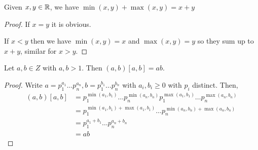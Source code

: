 \begin{lemma}
    Given $x, y \in \mathbb{R}$, we have $\min(x, y) + \max(x, y) = x + y$
\end{lemma}
\begin{proof}
    If $x = y$  it is obvious.

    If  $x < y$ then we have  $\min(x,y) = x$ and $\max(x, y) = y$ so they sum up to $x + y$, similar for $x > y$.
\end{proof}

\begin{theorem}
    Let $a, b \in Z$  with $a, b > 1$. Then $(a,b)[a,b] = ab$. 
\end{theorem}
\begin{proof}
    Write $a = p_1^{a_1} \dots p_n^{a_n}, b = p_1^{b_1} \dots p_n^{b_n}$  with $a_i,b_i \ge 0$ with  $p_i$ distinct. Then, 
     \begin{align*}
         (a, b)[a,b] &= p_1^{\min(a_1,b_1)} \dots p_n^{\min(a_n, b_n)} p_1^{\max(a_1,b_1)} \dots p_n^{\max(a_n, b_n)} \\
                    &= p_1^{\min(a_1,b_1) + \max(a_1, b_1)} \dots p_n^{\min(a_n, b_n) + \max(a_n, b_n)} \\
                    &= p_1^{a_1 + b_1} \dots p_n^{a_n + b_n} \\
                    &= ab
    \end{align*}
\end{proof}

